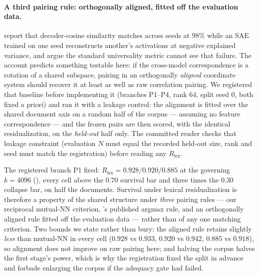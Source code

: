 \paragraph{A third pairing rule: orthogonally aligned, fitted off the evaluation data.}
\citet{polymorphism_rotation2026} report that decoder-cosine similarity matches across
seeds at $98\%$ while an SAE trained on one seed reconstructs another's activations at
negative explained variance, and argue the standard universality metric cannot see that
failure. The account predicts something testable here: if the cross-model correspondence is
a rotation of a shared subspace, pairing in an orthogonally \emph{aligned} coordinate
system should recover it at least as well as raw correlation pairing. We registered that
baseline before implementing it (branches P1--P4, rank $64$, split seed $0$, both fixed a
priori) and ran it with a leakage control: the alignment is fitted over the shared document
axis on a random half of the corpus --- assuming no feature correspondence --- and the
frozen pairs are then scored, with the identical residualization, on the \emph{held-out}
half only. The committed reader checks that leakage constraint (evaluation $N$ must equal
the recorded held-out size, rank and seed must match the registration) before reading any
$R_{\text{lex}}$.

The registered branch P1 fired: $R_{\text{lex}}=0.928/0.920/0.885$ at the governing
$k{=}4096$ (), every cell above the $0.70$ survival bar and three times
the $0.30$ collapse bar, on half the documents. Survival under lexical residualization is
therefore a property of the shared structure under \emph{three} pairing rules --- our
reciprocal mutual-NN criterion, \citeauthor{lan2024universal}'s published argmax rule, and
an orthogonally aligned rule fitted off the evaluation data --- rather than of any one
matching criterion. Two bounds we state rather than bury: the aligned rule retains slightly
\emph{less} than mutual-NN in every cell ($0.928$ vs $0.933$, $0.920$ vs $0.942$, $0.885$ vs
$0.918$), so alignment does not improve on raw pairing here; and halving the corpus halves
the first stage's power, which is why the registration fixed the split in advance and
forbade enlarging the corpus if the adequacy gate had failed.



